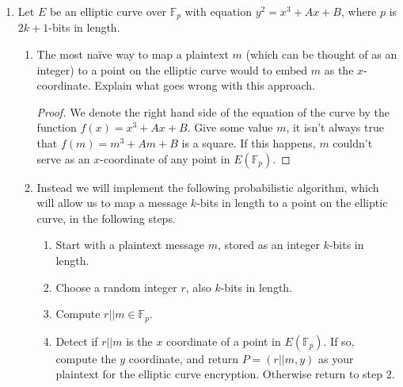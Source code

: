 \documentclass[11pt]{article}
\newcommand{\bF}{\mathbb{F}}
\begin{document}
\begin{enumerate}
{\begin{enumerate}
\begin{proof}
      This has an important advantage over the analogous problem over $\bF_p^*$ described in HW4.  In particular, the ECDLP is more secure than the DLP.
    \end{proof}
  \end{enumerate}
  }
  In the previous problem, the \textit{message} which was sent was a chosen point on an elliptic curve.  When the message is a number we can use ASCII to directly translate text to integers, but with points on an elliptic curve, the question is more subtle.  MV-Elgamal got around this subtlety just using the elliptic curve to create a shared secret, and using the coordinates as keys for a symmetric cipher whose plaintext are integers (not points).  In the following exercise we will describe another solution, using a probabilistic algorithm to map integers to points on the elliptic curve in a recoverable way.
  \item{
  Let $E$ be an elliptic curve over $\bF_p$ with equation $y^2 = x^3 + Ax + B$, where $p$ is $2k+1$-bits in length.
  \begin{enumerate}
    \item{
    The most na\"ive way to map a plaintext $m$ (which can be thought of as an integer) to a point on the elliptic curve would to embed $m$ as the $x$-coordinate.  Explain what goes wrong with this approach.
    }
    \begin{proof}
      We denote the right hand side of the equation of the curve by the function $f(x) = x^3+Ax+B$.  Give some value $m$, it isn't always true that $f(m) = m^3+Am+B$ is a square.  If this happens, $m$ couldn't serve as an $x$-coordinate of any point in $E(\bF_p)$.
    \end{proof}
    \item{
    Instead we will implement the following probabilistic algorithm, which will allow us to map a message $k$-bits in length to a point on the elliptic curve, in the following steps.
    \begin{enumerate}[(1)]
      \item{
      Start with a plaintext message $m$, stored as an integer $k$-bits in length.
      }
      \item{
      Choose a random integer $r$, also $k$-bits in length.
      }
      \item{
      Compute $r||m\in\bF_p$.
      }
      \item{
      Detect if $r||m$ is the $x$ coordinate of a point in $E(\bF_p)$.  If so, compute the $y$ coordinate, and return $P = (r||m,y)$ as your plaintext for the elliptic curve encryption.  Otherwise return to step 2.
}
\end{enumerate}}
\end{enumerate}}
\end{enumerate}
\end{document}
